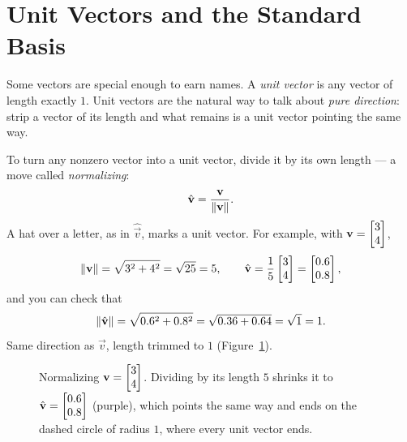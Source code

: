 \section{Unit Vectors and the Standard Basis}
\label{ch02:basis}

Some vectors are special enough to earn names. A \emph{unit vector} is any vector of
length exactly $1$. Unit vectors are the natural way to talk about \emph{pure direction}:
strip a vector of its length and what remains is a unit vector pointing the same way.

To turn any nonzero vector into a unit vector, divide it by its own length --- a move
called \emph{normalizing}:
\[
  \hat{\mathbf{v}} = \frac{\mathbf{v}}{\lVert\mathbf{v}\rVert}.
\]
A hat over a letter, as in $\hat{\vec{v}}$, marks a unit vector. For example, with
$\mathbf{v}=\begin{bmatrix}3\\4\end{bmatrix}$,
\[
  \lVert\mathbf{v}\rVert=\sqrt{3^2+4^2}=\sqrt{25}=5,
  \qquad
  \hat{\mathbf{v}} = \frac{1}{5}\begin{bmatrix}3\\4\end{bmatrix} = \begin{bmatrix}0.6\\0.8\end{bmatrix},
\]
and you can check that
\[
  \lVert\hat{\mathbf{v}}\rVert = \sqrt{0.6^2 + 0.8^2} = \sqrt{0.36+0.64} = \sqrt{1} = 1.
\]
Same direction as $\vec{v}$, length trimmed to $1$ (Figure~\ref{ch02:fig-normalize}).

\begin{figure}[htbp]
\centering
{}
\caption{Normalizing $\mathbf{v}=\begin{bmatrix}3\\4\end{bmatrix}$. Dividing by its length $5$ shrinks it to
$\hat{\mathbf{v}}=\begin{bmatrix}0.6\\0.8\end{bmatrix}$ (purple), which points the same way and ends on the
dashed circle of radius $1$, where every unit vector ends.}
\label{ch02:fig-normalize}
\end{figure}

